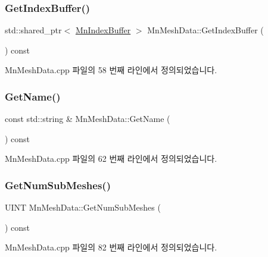 \subsubsection{\texorpdfstring{Get\+Index\+Buffer()}{GetIndexBuffer()}}
{\footnotesize\ttfamily std\+::shared\+\_\+ptr$<$ \hyperlink{class_m_n_l_1_1_mn_index_buffer}{Mn\+Index\+Buffer} $>$ Mn\+Mesh\+Data\+::\+Get\+Index\+Buffer (\begin{DoxyParamCaption}{ }\end{DoxyParamCaption}) const}



Mn\+Mesh\+Data.\+cpp 파일의 58 번째 라인에서 정의되었습니다.

\mbox{\label{class_m_n_l_1_1_mn_mesh_data_a3c08b6786c10601909da1cd2da7eb2dd}} 
\subsubsection{\texorpdfstring{Get\+Name()}{GetName()}}
{\footnotesize\ttfamily const std\+::string \& Mn\+Mesh\+Data\+::\+Get\+Name (\begin{DoxyParamCaption}{ }\end{DoxyParamCaption}) const}



Mn\+Mesh\+Data.\+cpp 파일의 62 번째 라인에서 정의되었습니다.

\mbox{\label{class_m_n_l_1_1_mn_mesh_data_a324ba83139ce03f30f59b616fbd2235a}} 
\subsubsection{\texorpdfstring{Get\+Num\+Sub\+Meshes()}{GetNumSubMeshes()}}
{\footnotesize\ttfamily U\+I\+NT Mn\+Mesh\+Data\+::\+Get\+Num\+Sub\+Meshes (\begin{DoxyParamCaption}{ }\end{DoxyParamCaption}) const}



Mn\+Mesh\+Data.\+cpp 파일의 82 번째 라인에서 정의되었습니다.

